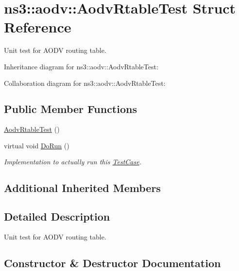 \hypertarget{structns3_1_1aodv_1_1AodvRtableTest}{}\section{ns3\+:\+:aodv\+:\+:Aodv\+Rtable\+Test Struct Reference}
\label{structns3_1_1aodv_1_1AodvRtableTest}


Unit test for A\+O\+DV routing table.  




Inheritance diagram for ns3\+:\+:aodv\+:\+:Aodv\+Rtable\+Test\+:


Collaboration diagram for ns3\+:\+:aodv\+:\+:Aodv\+Rtable\+Test\+:
\subsection*{Public Member Functions}
\begin{DoxyCompactItemize}
\item 
\hyperlink{structns3_1_1aodv_1_1AodvRtableTest_a354c2eff9035bc9c91b36c48b3e2ae23}{Aodv\+Rtable\+Test} ()
\item 
virtual void \hyperlink{structns3_1_1aodv_1_1AodvRtableTest_a9eb10e0a4367097b064fe9875d21e329}{Do\+Run} ()
\begin{DoxyCompactList}\small\item\em Implementation to actually run this \hyperlink{classns3_1_1TestCase}{Test\+Case}. \end{DoxyCompactList}\end{DoxyCompactItemize}
\subsection*{Additional Inherited Members}


\subsection{Detailed Description}
Unit test for A\+O\+DV routing table. 

\subsection{Constructor \& Destructor Documentation}
